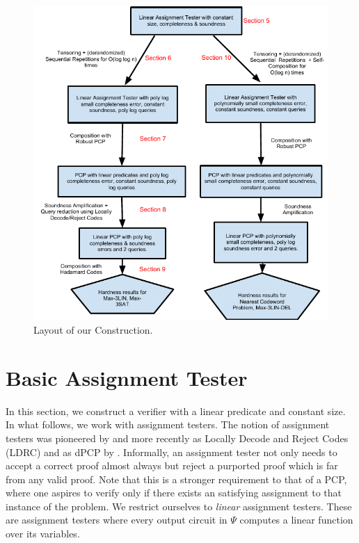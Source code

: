 \begin{figure}[hp]
\centering
\includegraphics{Layout}
\caption{Layout of our Construction.}
\label{figure:layout}
\end{figure}

\newpage

\section{Basic Assignment Tester} \label{section:basic} In this section, we
construct a verifier with a linear predicate and constant size.  In
what follows, we work with assignment testers. The notion of
assignment testers was pioneered by \cite{DR,BGHSV} and more recently
as Locally Decode and Reject Codes (LDRC) \cite{MR08} and as {\sf
  dPCP} by \cite{DH}.  Informally, an assignment tester not only needs
to accept a correct proof almost always but reject a purported proof
which is far from any valid proof. Note that this is a stronger
requirement to that of a PCP, where one aspires to verify only if
there exists an satisfying assignment to that instance of the problem.
We restrict ourselves to {\em linear} assignment testers. These are
assignment testers where every output circuit in $\Psi$ computes a
linear function over its variables.


